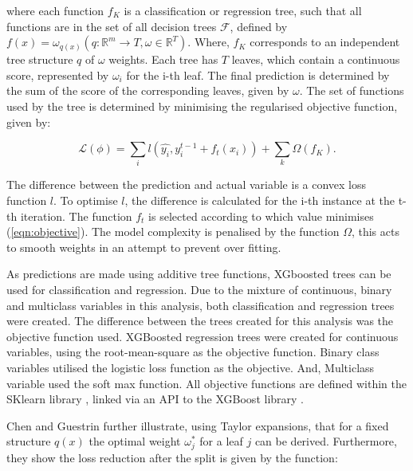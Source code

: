 \documentclass[review,12pt,authoryear]{elsarticle}
\begin{document}
\begin{linenumbers}
where each function $f_K$ is a classification or regression tree, such that all functions are in the set of all decision trees $\mathcal{F}$, defined by ${f(x) = \omega_{q(x)}}(q : \mathbb{R}^m \rightarrow T, \omega \in \mathbb{R}^T)$. 
Where, $f_K$ corresponds to an independent tree structure $q$ of $\omega$ weights. %
Each tree has $T$ leaves, which contain a continuous score, represented by $\omega_i$ for the i-th leaf. 
The final prediction %
is determined by the sum of the score of the corresponding leaves, given by $\omega$. 
The set of functions %
used by the tree is determined by minimising the regularised objective function, given by:

\begin{equation}\label{eqn:objective}
 \mathcal{L}(\phi)=\sum_i l(\hat{y_i}, y_i^{t-1} + f_t(x_i)) + \sum_k \Omega (f_K).
\end{equation}

The difference between the prediction and actual variable is a convex loss function $l$. To optimise $l$, the difference is calculated for the i-th instance at the t-th iteration. The function $f_t$ is selected according to which value minimises (\ref{eqn:objective}). The model complexity is penalised by the function $\Omega$, this acts to smooth weights in an attempt to prevent over fitting.
\par
As predictions are made using additive tree functions, XGboosted trees can be used for classification and regression. Due to the mixture of continuous, binary and multiclass variables in this analysis, both classification and regression trees were created. The difference between the trees created for this analysis was the objective function used. XGBoosted regression trees were created for continuous variables, using the root-mean-square as the objective function. Binary class variables utilised the logistic loss function as the objective. And, Multiclass variable used the soft max function. All objective functions are defined within the SKlearn library \citep{sklearn_api}, linked via an API to the XGBoost library \citep{chenXGBoostScalableTree2016}.
\par
Chen and Guestrin \citep{chenXGBoostScalableTree2016} further illustrate, using Taylor expansions, that for a fixed structure $q(x)$ the optimal weight $\omega^*_j$ for a leaf $j$ can be derived. Furthermore, they show the loss reduction after the split is given by the function:


\end{linenumbers}
\end{document}
